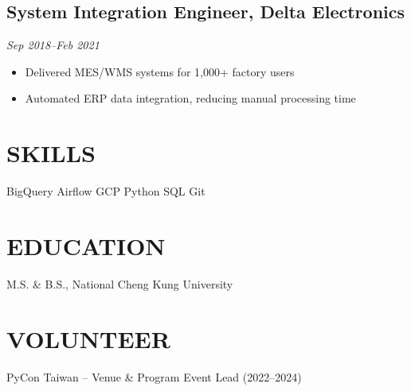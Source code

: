 \documentclass[a4paper,10pt]{article}
\begin{document}
\subsection*{System Integration Engineer, Delta Electronics}
\textit{\color{gray}Sep 2018–Feb 2021}
\begin{itemize}
    \item Delivered MES/WMS systems for 1,000+ factory users
    \item Automated ERP data integration, reducing manual processing time
\end{itemize}

\section*{SKILLS}
BigQuery \quad Airflow \quad GCP \quad Python \quad SQL \quad Git

\section*{EDUCATION}
M.S. \& B.S., National Cheng Kung University

\section*{VOLUNTEER}
PyCon Taiwan – Venue \& Program Event Lead (2022–2024)
\end{document}
